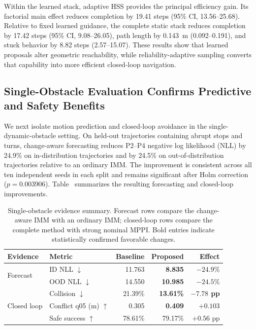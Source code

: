 \documentclass[conference]{IEEEtran}
\newcommand{\reviewbox}[2]{%
    \begingroup
    \setlength{\fboxsep}{0.35pt}%
    \setlength{\fboxrule}{0.45pt}%
    \hyperref[#1]{\fcolorbox{red}{white}{\vphantom{I}#2}}%
    \endgroup}
\newcommand{\reviewref}[1]{\reviewbox{#1}{\ref*{#1}}}
\newcommand{\reviewref}[1]{\ref{#1}}
\begin{document}
Within the learned stack, adaptive HSS provides the principal efficiency
gain. Its factorial main effect reduces completion by 19.41 steps
(95\% CI, 13.56--25.68). Relative to fixed learned guidance, the complete
static stack reduces completion by 17.42 steps
(95\% CI, 9.08--26.05), path length by 0.143~m
(0.092--0.191), and stuck behavior by 8.82 steps
(2.57--15.07). These results show that learned proposals alter geometric
reachability, while reliability-adaptive sampling converts that capability
into more efficient closed-loop navigation.

\subsection{Single-Obstacle Evaluation Confirms Predictive and Safety Benefits}

We next isolate motion prediction and closed-loop avoidance in the
single-dynamic-obstacle setting. On held-out trajectories containing abrupt
stops and turns, change-aware forecasting reduces P2--P4 negative log
likelihood (NLL) by 24.9\% on in-distribution trajectories and by 24.5\%
on out-of-distribution trajectories relative to an ordinary IMM. The
improvement is consistent across all ten independent seeds in each split and
remains significant after Holm correction ($p=0.003906$).
Table~\reviewref{tab:single_obstacle_summary} summarizes the resulting
forecasting and closed-loop improvements.

\begin{table}[t]
\caption{Single-obstacle evidence summary. Forecast rows compare the
change-aware IMM with an ordinary IMM; closed-loop rows compare the complete
method with strong nominal MPPI. Bold entries indicate statistically
confirmed favorable changes.}
\label{tab:single_obstacle_summary}
\centering
\scriptsize
\setlength{\tabcolsep}{2.7pt}
\begin{tabular}{llrrr}
\toprule
\textbf{Evidence} & \textbf{Metric}
& \textbf{Baseline} & \textbf{Proposed} & \textbf{Effect} \\
\midrule
\multirow{2}{*}{Forecast}
& ID NLL $\downarrow$
& 11.763 & \textbf{8.835} & \textbf{$-24.9\%$} \\
& OOD NLL $\downarrow$
& 14.550 & \textbf{10.985} & \textbf{$-24.5\%$} \\
\midrule
\multirow{3}{*}{Closed loop}
& Collision $\downarrow$
& 21.39\% & \textbf{13.61\%} & \textbf{$-7.78$ pp} \\
& Conflict q05 (m) $\uparrow$
& 0.305 & \textbf{0.409} & \textbf{$+0.103$} \\
& Safe success $\uparrow$
& 78.61\% & 79.17\% & $+0.56$ pp \\
\bottomrule
\end{tabular}
\end{table}
\end{document}
